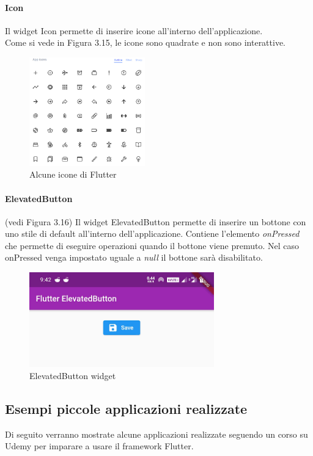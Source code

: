\paragraph{Icon}
Il widget Icon permette di inserire icone all'interno dell'applicazione.\\
Come si vede in Figura 3.15, le icone sono quadrate e non sono interattive.
\begin{figure}[htbp]	
	\centering
	\includegraphics[width=5cm]{immagini/icon.png}
	\caption{Alcune icone di Flutter}
	\label{fig:Alcune icone di Flutter}
\end{figure}

\paragraph{ElevatedButton} (vedi Figura 3.16)
Il widget ElevatedButton permette di inserire un bottone con uno stile di default all'interno dell'applicazione.
Contiene l'elemento \textit{onPressed} che permette di eseguire operazioni quando il bottone viene premuto. Nel caso onPressed venga impostato uguale a \textit{null} il bottone sarà disabilitato.\\
\begin{figure}[htbp]	
	\centering
	\includegraphics[width=8cm]{immagini/button.png}
	\caption{ElevatedButton widget}
	\label{fig:ElevatedButton widget}
\end{figure}

\newpage

\subsection{Esempi piccole applicazioni realizzate}
Di seguito verranno mostrate alcune applicazioni realizzate seguendo un corso su Udemy \cite{corso} per imparare a usare il framework Flutter.

